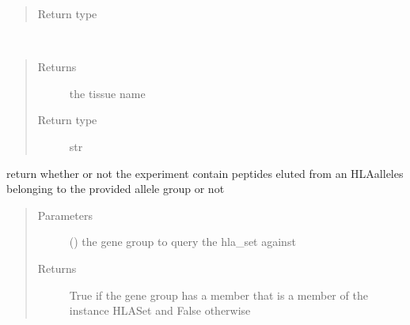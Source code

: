 \documentclass[letterpaper,10pt,english]{sphinxmanual}
\begin{document}
\begin{fulllineitems}
\begin{fulllineitems}
\begin{quote}
\begin{description}
\item[{Return type}] \leavevmode
{\hyperref[\detokenize{IPTK.Classes:IPTK.Classes.Tissue.Tissue}]{}}

\end{description}\end{quote}

\end{fulllineitems}


\begin{fulllineitems}
\label{\detokenize{IPTK.Classes:IPTK.Classes.Experiment.Experiment.get_tissue_name}}~\begin{quote}\begin{description}
\item[{Returns}] \leavevmode
the tissue name

\item[{Return type}] \leavevmode
str

\end{description}\end{quote}

\end{fulllineitems}


\begin{fulllineitems}
\label{\detokenize{IPTK.Classes:IPTK.Classes.Experiment.Experiment.has_allele_group}}
return whether or not the experiment contain peptides eluted from an HLA\sphinxhyphen{}alleles belonging to the provided allele group or not
\begin{quote}\begin{description}
\item[{Parameters}] \leavevmode
{} () \textendash{} the gene group to query the hla\_set against

\item[{Returns}] \leavevmode
True if the gene group has a member that is a member of the instance HLASet and False otherwise


\end{description}
\end{quote}
\end{fulllineitems}
\end{fulllineitems}
\end{document}

